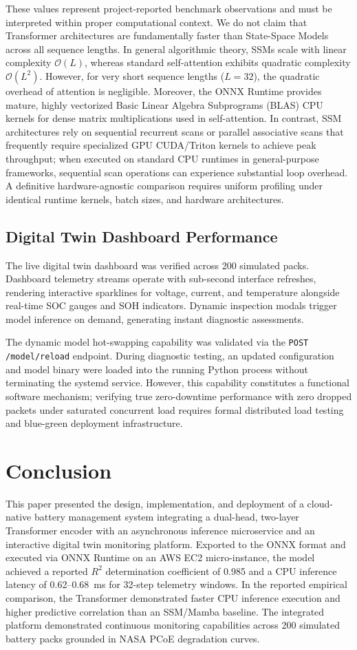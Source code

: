 \documentclass[conference]{IEEEtran}
\begin{document}
These values represent project-reported benchmark observations and must be interpreted within proper computational context. We do not claim that Transformer architectures are fundamentally faster than State-Space Models across all sequence lengths. In general algorithmic theory, SSMs scale with linear complexity $\mathcal{O}(L)$, whereas standard self-attention exhibits quadratic complexity $\mathcal{O}(L^2)$. However, for very short sequence lengths ($L = 32$), the quadratic overhead of attention is negligible. Moreover, the ONNX Runtime provides mature, highly vectorized Basic Linear Algebra Subprograms (BLAS) CPU kernels for dense matrix multiplications used in self-attention. In contrast, SSM architectures rely on sequential recurrent scans or parallel associative scans that frequently require specialized GPU CUDA/Triton kernels to achieve peak throughput; when executed on standard CPU runtimes in general-purpose frameworks, sequential scan operations can experience substantial loop overhead. A definitive hardware-agnostic comparison requires uniform profiling under identical runtime kernels, batch sizes, and hardware architectures.

\subsection{Digital Twin Dashboard Performance}
The live digital twin dashboard was verified across 200 simulated packs. Dashboard telemetry streams operate with sub-second interface refreshes, rendering interactive sparklines for voltage, current, and temperature alongside real-time SOC gauges and SOH indicators. Dynamic inspection modals trigger model inference on demand, generating instant diagnostic assessments.

The dynamic model hot-swapping capability was validated via the \texttt{POST /model/reload} endpoint. During diagnostic testing, an updated configuration and model binary were loaded into the running Python process without terminating the systemd service. However, this capability constitutes a functional software mechanism; verifying true zero-downtime performance with zero dropped packets under saturated concurrent load requires formal distributed load testing and blue-green deployment infrastructure.

\section{Conclusion}
This paper presented the design, implementation, and deployment of a cloud-native battery management system integrating a dual-head, two-layer Transformer encoder with an asynchronous inference microservice and an interactive digital twin monitoring platform. Exported to the ONNX format and executed via ONNX Runtime on an AWS EC2 micro-instance, the model achieved a reported $R^2$ determination coefficient of 0.985 and a CPU inference latency of 0.62--0.68~ms for 32-step telemetry windows. In the reported empirical comparison, the Transformer demonstrated faster CPU inference execution and higher predictive correlation than an SSM/Mamba baseline. The integrated platform demonstrated continuous monitoring capabilities across 200 simulated battery packs grounded in NASA PCoE degradation curves.
\end{document}
